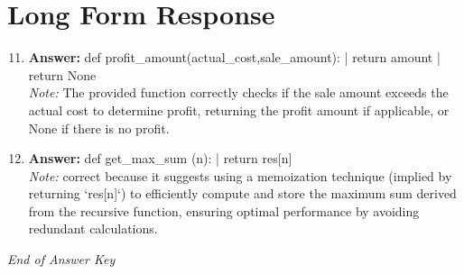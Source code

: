 \documentclass[12pt]{article}
\begin{document}
\section*{Long Form Response}
\begin{enumerate}[label=\arabic*.]
\setcounter{enumi}{10}
\item \textbf{Answer:} def profit\_amount(actual\_cost,sale\_amount): | return amount | return None
\\ \textit{Note:} The provided function correctly checks if the sale amount exceeds the actual cost to determine profit, returning the profit amount if applicable, or None if there is no profit.
\item \textbf{Answer:} def get\_max\_sum (n): | return res[n]
\\ \textit{Note:} correct because it suggests using a memoization technique (implied by returning `res[n]`) to efficiently compute and store the maximum sum derived from the recursive function, ensuring optimal performance by avoiding redundant calculations.
\end{enumerate}

\vfill
\noindent\textit{End of Answer Key}
\end{document}
